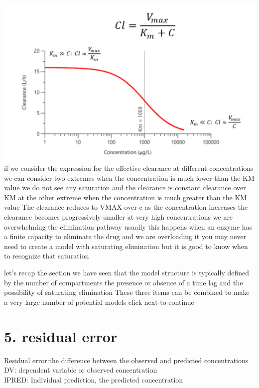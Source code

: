 \documentclass[
  letterpaper,
  DIV=11,
  numbers=noendperiod]{scrreprt}
\begin{document}
\includegraphics{./img/saturation-5.png} if we consider the expression
for the effective clearance at different concentrations we can consider
two extremes when the concentration is much lower than the KM value we
do not see any saturation and the clearance is constant clearance over
KM at the other extreme when the concentration is much greater than the
KM value The clearance reduces to VMAX over c as the concentration
increases the clearance becomes progressively smaller at very high
concentrations we are overwhelming the elimination pathway usually this
happens when an enzyme has a finite capacity to eliminate the drug and
we are overloading it you may never need to create a model with
saturating elimination but it is good to know when to recognize that
saturation

let's recap the section we have seen that the model structure is
typically defined by the number of compartments the presence or absence
of a time lag and the possibility of saturating elimination These three
items can be combined to make a very large number of potential models
click next to continue

\hypertarget{residual-error}{%
\section{5. residual error}\label{residual-error}}

Residual error:the difference between the observed and predicted
concentrations DV: dependent variable or observed concentration\\
IPRED: Individual prediction, the predicted concentration
\end{document}
